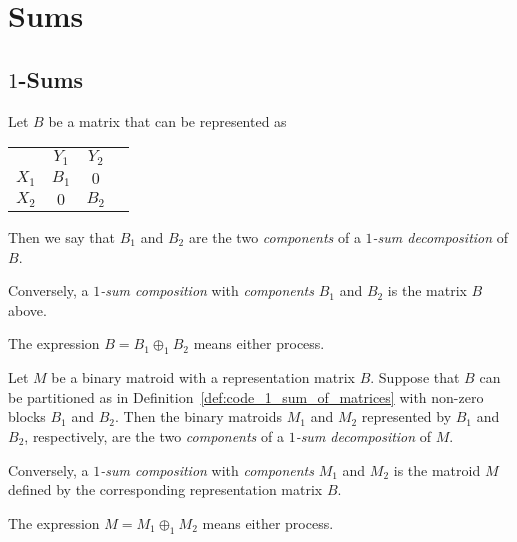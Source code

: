 \section{Sums}

\subsection{$1$-Sums}

\begin{definition}
  \label{def:code_1_sum_of_matrices}
  Let $B$ be a matrix that can be represented as
  \begin{tabular}{cccc}
                                 & $Y_{1}$                      & $Y_{2}$                      \\ \cline{2-3}
    \multicolumn{1}{c|}{$X_{1}$} & \multicolumn{1}{c|}{$B_{1}$} & \multicolumn{1}{c|}{    $0$} \\ \cline{2-3}
    \multicolumn{1}{c|}{$X_{2}$} & \multicolumn{1}{c|}{    $0$} & \multicolumn{1}{c|}{$B_{2}$} \\ \cline{2-3}
  \end{tabular}
  Then we say that $B_{1}$ and $B_{2}$ are the two \emph{components} of a \emph{$1$-sum decomposition} of $B$.

  Conversely, a \emph{$1$-sum composition} with \emph{components} $B_{1}$ and $B_{2}$ is the matrix $B$ above.

  The expression $B = B_{1} \oplus_{1} B_{2}$ means either process.
\end{definition}

\begin{definition}
  \label{def:code_1_sum_of_binary}
  Let $M$ be a binary matroid with a representation matrix $B$.
  Suppose that $B$ can be partitioned as in Definition~\ref{def:code_1_sum_of_matrices} with non-zero blocks $B_{1}$ and $B_{2}$.
  Then the binary matroids $M_{1}$ and $M_{2}$ represented by $B_{1}$ and $B_{2}$, respectively, are the two \emph{components} of a \emph{$1$-sum decomposition} of $M$.

  Conversely, a \emph{$1$-sum composition} with \emph{components} $M_{1}$ and $M_{2}$ is the matroid $M$ defined by the corresponding representation matrix $B$.

  The expression $M = M_{1} \oplus_{1} M_{2}$ means either process.
\end{definition}

